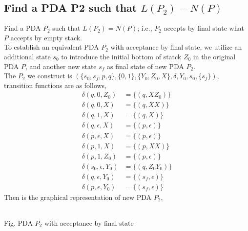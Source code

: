 \documentclass[11pt,a4paper]{article}
\newcommand{\htab}{\hspace*{0.63cm}}
\newcommand{\pg}{\\[0.3cm]}
\newcommand{\Y}{Y_{0}}
\begin{document}
\subsection{Find a PDA P2 such that $L(P_{2}) = N(P)$}
\htab Find a PDA $P_{2}$ such that $L(P_{2}) = N(P)$; i.e., $P_{2}$ accepts by final state what $P$ accepts by empty stack. \pg
\htab To establish an equivalent PDA $P_{2}$ with acceptance by final state, we utilize an additional state $s_{0}$ to introduce the initial bottom of statck $Z_{0}$ in the original PDA $P$, and another new state $s_{f}$ as final state of new PDA $P_{2}$.\\
\htab The $P_{2}$ we construct is $(\{s_{0}, s_{f}, p, q\}, \{ 0, 1\}, \{\Y, Z_{0}, X\}, \delta, \Y, s_{0}, \{s_{f}\})$, transition functions are as follows,
    \begin{align}
        \delta(q, 0, Z_{0}) &= \{ (q, XZ_{0})\} \\
        \delta(q, 0, X) &= \{ (q, XX)\} \\
        \delta(q, 1, X) &= \{ (q, X) \} \\
        \delta(q, \epsilon, X) &= \{ (p, \epsilon)\} \\
        \delta(p, \epsilon, X) &= \{ (p, \epsilon)\} \\
        \delta(p, 1, X) &= \{ (p, XX)\} \\
        \delta(p, 1, Z_{0}) &= \{ (p, \epsilon)\} \\
        \delta(s_{0}, \epsilon, \Y) &= \{ (q, Z_{0}\Y)\} \label{PDA2:new1} \\
        \delta(q, \epsilon, \Y) &= \{ (s_{f}, \epsilon)\}\label{PDA2:new2} \\
        \delta(p, \epsilon, \Y) &= \{ (s_{f}, \epsilon)\} \label{PDA2:new3} 
    \end{align}
\htab Then is the graphical representation of new PDA $P_{2}$,\\
\begin{center}
\\[0.5cm]
\footnotesize Fig. PDA $P_{2}$ with acceptance by final state
\end{center}
\newpage
\end{document}
